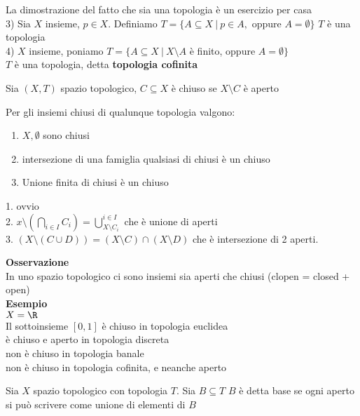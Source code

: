 \documentclass{article}
\begin{document}
	La dimostrazione del fatto che sia una topologia è un esercizio per casa\\
	3) Sia $X$ insieme, $p\in X$. Definiamo  $T = \{A\subseteq X \ | \ p\in A, $ oppure $A = \emptyset\}$  $T$ è una topologia\\
	4) $X$ insieme, poniamo $T = \{A\subseteq X \ | \ X\setminus A $ è finito, oppure $A = \emptyset\}$\\
$T$ è una topologia, detta \textbf{topologia cofinita}\\
\begin{defi}
	Sia $(X,T)$ spazio topologico, $C\subseteq X$ è chiuso se $X\setminus C$ è aperto 
\end{defi}
\begin{lemm}
Per gli insiemi chiusi di qualunque topologia valgono:
	\begin{enumerate}
		\item $X,\emptyset$ sono chiusi
		\item intersezione di una famiglia qualsiasi di chiusi è un chiuso
		\item Unione finita di chiusi è un chiuso
	\end{enumerate}
\end{lemm}
\begin{dimo}
	1. ovvio\\
	2. $\displaystyle x\setminus \left( \bigcap_{i\in I}C_i \right) = \bigcup^{i\in I}_{X\setminus C_i}$ che è unione di aperti\\
	3. $(X\setminus(C\cup D)) = (X\setminus C)\cap (X\setminus D)$ che è intersezione di 2 aperti.
\end{dimo}
\textbf{Osservazione}\\
In uno spazio topologico ci sono insiemi sia aperti che chiusi (clopen = closed + open)\\
\textbf{Esempio}\\
$X = \R$\\ 
Il sottoinsieme  $[0,1]$ è chiuso in topologia euclidea\\
è chiuso e aperto in topologia discreta\\
non è chiuso in topologia banale\\
non è chiuso in topologia cofinita, e neanche aperto\\
\begin{defi}
	Sia $X$ spazio topologico con topologia $T$. Sia $B\subseteq T$  $B$ è detta base se ogni aperto si può scrivere come unione di elementi di $B$
\end{defi}
\end{document}
